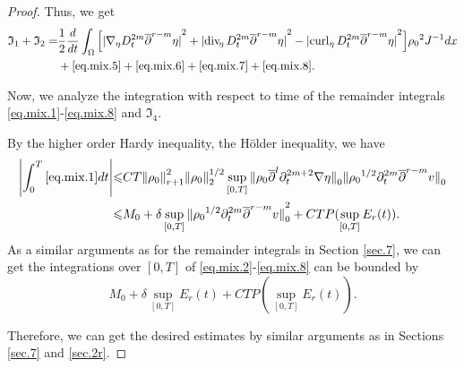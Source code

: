 \documentclass[12pt,twoside,reqno]{amsart}
\numberwithin{equation}{section}
\theoremstyle{definition}
\theoremstyle{remark}
\begin{document}
\begin{proof}
Thus, we get
\begin{align*}
  {\mathfrak{I}}_1+{\mathfrak{I}}_2=&\frac{1}{2}\frac{d}{dt}\int_\Omega \Big[{\vert{{\nabla}_\eta D_t^{2m}{\overline{\partial}}^{r-m} \eta}\vert}^2+{\vert{{\mathrm{div}_{\!\eta}\,} D_t^{2m}{\overline{\partial}}^{r-m} \eta}\vert}^2-{\vert{{\mathrm{curl}_\eta\,} D_t^{2m}{\overline{\partial}}^{r-m} \eta}\vert}^2\Big]{\rho_0}^2 J^{-1}dx\\
  &+\eqref{eq.mix.5}+\eqref{eq.mix.6}+\eqref{eq.mix.7}+\eqref{eq.mix.8}.
\end{align*}

Now, we analyze the integration with respect to time of the remainder integrals \eqref{eq.mix.1}-\eqref{eq.mix.8} and ${\mathfrak{I}}_4$.

By the higher order Hardy inequality, the H\"older inequality, we have
\begin{align*}
  {\left\vert{\int_0^T\eqref{eq.mix.1} dt}\right\vert}{\leqslant} &CT{\Vert{\rho_0}\Vert}_{r+1}^2{\Vert{\rho_0}\Vert}_2^{1/2}\sup_{[0,T]}{\Vert{{\rho_0}{\overline{\partial}}^l{\partial}_t^{2m+2}{\nabla}\eta}\Vert}_0 {\Vert{{\rho_0}^{1/2}{\partial}_t^{2m}{\overline{\partial}}^{r-m}v}\Vert}_0\\
  {\leqslant} &M_0+\delta\sup_{[0,T]}{\Vert{{\rho_0}^{1/2}{\partial}_t^{2m}{\overline{\partial}}^{r-m}v}\Vert}_0^2+ CTP(\sup_{[0,T]} E_r(t)).
\end{align*}
As a similar arguments as for the remainder integrals in Section \ref{sec.7}, we can get the integrations over $[0,T]$ of \eqref{eq.mix.2}-\eqref{eq.mix.8} can be bounded by
$$M_0+\delta\sup_{[0,T]}E_r(t)+ CTP(\sup_{[0,T]} E_r(t)).$$

Therefore, we can get the desired estimates by similar arguments as in Sections \ref{sec.7} and \ref{sec.2r}.


\end{proof}
\end{document}

